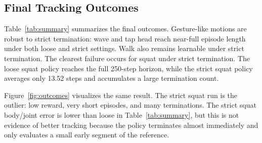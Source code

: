 \documentclass[10pt]{article}
\begin{document}
\subsection{Final Tracking Outcomes}

Table~\ref{tab:summary} summarizes the final outcomes. Gesture-like motions are robust to strict termination: wave and tap head reach near-full episode length under both loose and strict settings. Walk also remains learnable under strict termination. The clearest failure occurs for squat under strict termination. The loose squat policy reaches the full 250-step horizon, while the strict squat policy averages only 13.52 steps and accumulates a large termination count.

\begin{table}[t]
\centering
\caption{Final PPO tracking outcomes. Termination total is the sum of anchor-position and end-effector/body-position terminations reported at the end of training.}
\label{tab:summary}
\end{table}

Figure~\ref{fig:outcomes} visualizes the same result. The strict squat run is the outlier: low reward, very short episodes, and many terminations. The strict squat body/joint error is lower than loose in Table~\ref{tab:summary}, but this is not evidence of better tracking because the policy terminates almost immediately and only evaluates a small early segment of the reference.
\end{document}
